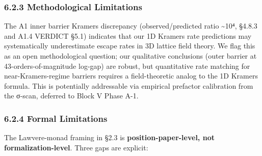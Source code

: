 \documentclass[
]{article}
\begin{document}
\hypertarget{methodological-limitations}{%
\subsubsection{6.2.3 Methodological
Limitations}\label{methodological-limitations}}

The A1 inner barrier Kramers discrepancy (observed/predicted ratio
\textasciitilde10⁴, §4.8.3 and A1.4 VERDICT §5.1) indicates that our 1D
Kramers rate predictions may systematically underestimate escape rates
in 3D lattice field theory. We flag this as an open methodological
question; our qualitative conclusions (outer barrier at
43-orders-of-magnitude log-gap) are robust, but quantitative rate
matching for near-Kramers-regime barriers requires a field-theoretic
analog to the 1D Kramers formula. This is potentially addressable via
empirical prefactor calibration from the σ-scan, deferred to Block V
Phase A-1.

\hypertarget{formal-limitations}{%
\subsubsection{6.2.4 Formal Limitations}\label{formal-limitations}}

The Lawvere-monad framing in §2.3 is \textbf{position-paper-level, not
formalization-level}. Three gaps are explicit:
\end{document}
